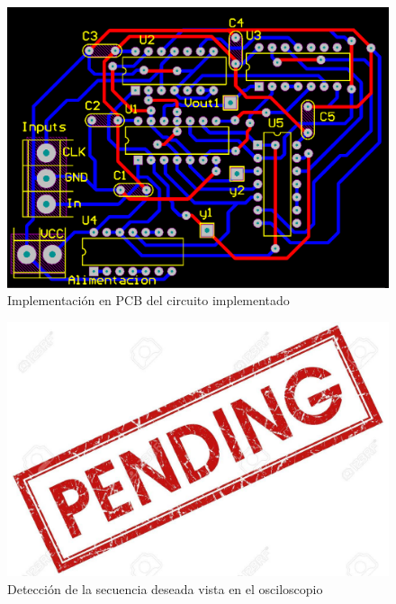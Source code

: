\begin{figure}[H]
\centering
\includegraphics{ImagenesEjercicio2/pcb.png}
\caption{Implementación en PCB del circuito implementado }
\end{figure}


\begin{figure}[H]
\centering
\includegraphics{ImagenesEjercicio2/pend.jpg}
\caption{Detección de la secuencia deseada vista en el osciloscopio }
\end{figure}


